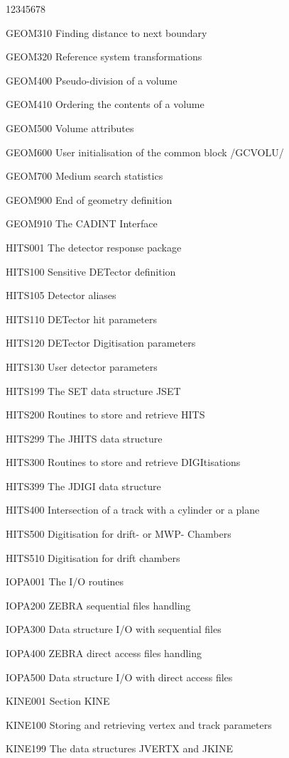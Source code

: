 \begin{DLtt}{12345678}
\item[GEOM310] Finding distance to next boundary
\item[GEOM320] Reference system transformations
\item[GEOM400] Pseudo-division of a volume
\item[GEOM410] Ordering the contents of a volume
\item[GEOM500] Volume attributes
\item[GEOM600] User initialisation of the common block /GCVOLU/
\item[GEOM700] Medium search statistics
\item[GEOM900] End of geometry definition
\item[GEOM910] The CADINT Interface
\item[HITS001] The detector response package
\item[HITS100] Sensitive DETector definition
\item[HITS105] Detector aliases
\item[HITS110] DETector hit parameters
\item[HITS120] DETector Digitisation parameters
\item[HITS130] User detector parameters
\item[HITS199] The SET data structure JSET
\item[HITS200] Routines to store and retrieve HITS
\item[HITS299] The JHITS data structure
\item[HITS300] Routines to store and retrieve DIGItisations
\item[HITS399] The JDIGI data structure
\item[HITS400] Intersection of a track with a cylinder or a plane
\item[HITS500] Digitisation for drift- or MWP- Chambers
\item[HITS510] Digitisation for drift chambers
\item[IOPA001] The I/O routines
\item[IOPA200] ZEBRA sequential files handling
\item[IOPA300] Data structure I/O with sequential files
\item[IOPA400] ZEBRA direct access files handling
\item[IOPA500] Data structure I/O with direct access files
\item[KINE001] Section KINE
\item[KINE100] Storing and retrieving vertex and track parameters
\item[KINE199] The data structures JVERTX and JKINE

\end{DLtt}
